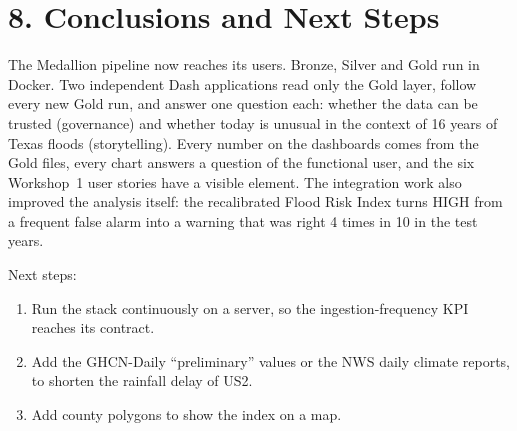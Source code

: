 \documentclass[stu, 12pt, letterpaper, donotrepeattitle, floatsintext, natbib]{apa7}
\begin{document}
\section{\large 8. Conclusions and Next Steps}
The Medallion pipeline now reaches its users. Bronze, Silver and Gold run in Docker. Two independent Dash applications read only the Gold layer, follow every new Gold run, and answer one question each: whether the data can be trusted (governance) and whether today is unusual in the context of 16 years of Texas floods (storytelling). Every number on the dashboards comes from the Gold files, every chart answers a question of the functional user, and the six Workshop~1 user stories have a visible element. The integration work also improved the analysis itself: the recalibrated Flood Risk Index turns HIGH from a frequent false alarm into a warning that was right 4 times in 10 in the test years.

Next steps:
\begin{enumerate}
    \item Run the stack continuously on a server, so the ingestion-frequency KPI reaches its contract.
    \item Add the GHCN-Daily ``preliminary'' values or the NWS daily climate reports, to shorten the rainfall delay of US2.
    \item Add county polygons to show the index on a map.
\end{enumerate}

\newpage
\renewcommand\refname{\large\textbf{References}}
\nocite{apache2026, docker2026, nws2026, noaa2026, menne2012, mckinney2010}

\end{document}
